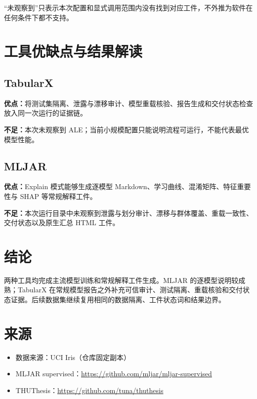 \documentclass[degree=bachelor,language=chinese,fontset=fandol]{thuthesis}
\begin{document}
“未观察到”只表示本次配置和显式调用范围内没有找到对应工件，不外推为软件在任何条件下都不支持。

\chapter{工具优缺点与结果解读}
\section{TabularX}
\textbf{优点：}将测试集隔离、泄露与漂移审计、模型重载核验、报告生成和交付状态检查放入同一次运行的证据链。

\textbf{不足：}本次未观察到 ALE；当前小规模配置只能说明流程可运行，不能代表最优模型性能。

\section{MLJAR}
\textbf{优点：}Explain 模式能够生成逐模型 Markdown、学习曲线、混淆矩阵、特征重要性与 SHAP 等常规解释工件。

\textbf{不足：}本次运行目录中未观察到泄露与划分审计、漂移与群体覆盖、重载一致性、交付状态以及原生汇总 HTML 工件。

\chapter{结论}
两种工具均完成主流模型训练和常规解释工件生成。MLJAR 的逐模型说明较成熟；TabularX 在常规模型报告之外补充可信审计、测试隔离、重载核验和交付状态证据。后续数据集继续复用相同的数据隔离、工件状态词和结果边界。

\backmatter
\chapter{来源}
\begin{itemize}
  \item 数据来源：UCI Iris（仓库固定副本）
  \item MLJAR supervised：\url{https://github.com/mljar/mljar-supervised}
  \item THUThesis：\url{https://github.com/tuna/thuthesis}
\end{itemize}
\end{document}
